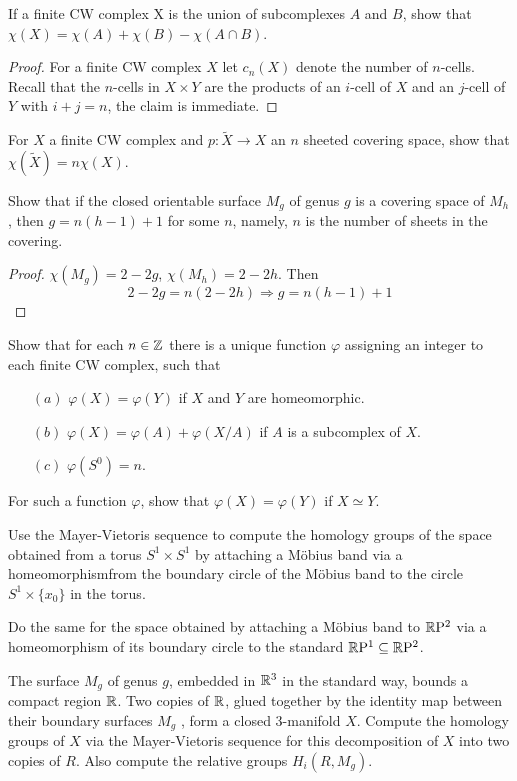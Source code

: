\begin{exercise}
If a finite CW complex X is the union of subcomplexes $A$ and $B$, show that
$\chi(X)=\chi(A)+\chi(B)-\chi(A\cap B)$.
\end{exercise}
\begin{proof}
For a finite CW complex $X$ let $c_n(X)$ denote the number of $n$-cells. Recall that the $n$-cells in $X\times Y$ are the products of an $i$-cell of $X$ and an $j$-cell of $Y$ with $i+j=n$, the claim is immediate.
\end{proof}
\begin{exercise}
For $X$ a finite CW complex and $p:\widetilde{X}\to X$ an $n$ sheeted covering space, show that $\chi(\widetilde{X})=n\chi(X)$.
\end{exercise}
\begin{exercise}
Show that if the closed orientable surface $M_g$ of genus $g$ is a covering space of $M_h$, then $g=n(h-1)+1$ for some $n$, namely, $n$ is the number of sheets in the covering.
\end{exercise}
\begin{proof}
$\chi(M_g)=2-2g$, $\chi(M_h)=2-2h$. Then
\[2-2g=n(2-2h)\Rightarrow g=n(h-1)+1\]
\end{proof}
\begin{exercise}
Show that for each $n\in\mathbb{Z}$ there is a unique function $\varphi$ assigning an integer to each finite CW complex, such that 
\begin{itemize}
\item[$(a)$]$\varphi(X)=\varphi(Y)$ if $X$ and $Y$ are homeomorphic.
\item[$(b)$]$\varphi(X)=\varphi(A)+\varphi(X/A)$ if $A$ is a subcomplex of $X$.
\item[$(c)$]$\varphi(S^0)=n$.
\end{itemize}
For such a function $\varphi$, show that $\varphi(X)=\varphi(Y)$ if $X\simeq Y$.
\end{exercise}
\begin{exercise}
Use the Mayer-Vietoris sequence to compute the homology groups of the space
obtained from a torus $S^1\times S^1$ by attaching a M\"obius band via a homeomorphismfrom the boundary circle of the M\"obius band to the circle $S^1\times\{x_0\}$ in the torus.\par
Do the same for the space obtained by attaching a M\"obius band to $\mathbb{R}\mathrm{P}^2$ via a
homeomorphism of its boundary circle to the standard $\mathbb{R}\mathrm{P}^1\subseteq\mathbb{R}\mathrm{P}^2$.
\end{exercise}
\begin{exercise}
The surface $M_g$ of genus $g$, embedded in $\mathbb{R}^3$ in the standard way, bounds a
compact region $\mathbb{R}$. Two copies of $\mathbb{R}$, glued together by the identity map between their boundary surfaces $M_g$ , form a closed $3$-manifold $X$. Compute the homology groups of $X$ via the Mayer-Vietoris sequence for this decomposition of $X$ into two copies of $R$. Also compute the relative groups $H_i(R,M_g)$.
\end{exercise}
